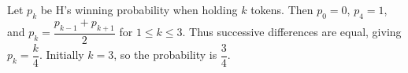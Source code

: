 Let $p_k$ be H's winning probability when holding $k$ tokens. Then $p_0=0$, $p_4=1$, and $p_k=\dfrac{p_{k-1}+p_{k+1}}{2}$ for $1\le k\le3$. Thus successive differences are equal, giving $p_k=\dfrac{k}{4}$. Initially $k=3$, so the probability is $\boxed{\dfrac{3}{4}}$.

